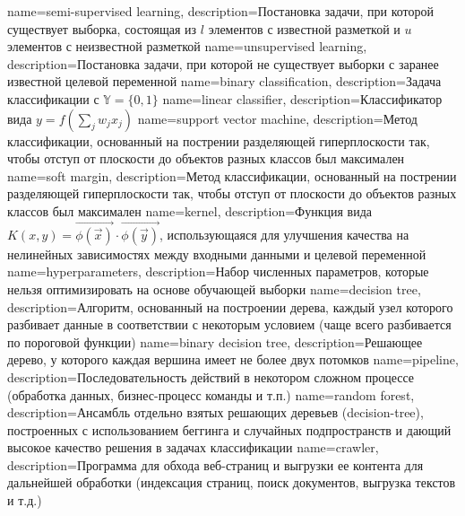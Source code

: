{
    name=semi-supervised learning,
    description={Постановка задачи, при которой существует выборка, состоящая из $l$ элементов с известной разметкой и $u$ элементов с неизвестной разметкой}
}
{
    name=unsupervised learning,
    description={Постановка задачи, при которой не существует выборки с заранее известной целевой переменной}
}
{
    name=binary classification,
    description={Задача классификации с $\mathbb{Y} = \{0, 1\}$}
}
{
    name=linear classifier,
    description={Классификатор вида $y = f\left( \sum\limits_{j}^{} w_j x_j \right)$}
}
{
    name=support vector machine,
    description={Метод классификации, основанный на пострении разделяющей гиперплоскости так, чтобы отступ от плоскости до объектов разных классов был максимален}
}
{
    name=soft margin,
    description={Метод классификации, основанный на пострении разделяющей гиперплоскости так, чтобы отступ от плоскости до объектов разных классов был максимален}
}
{
    name=kernel,
    description={Функция вида $K(x, y) = \vec{\phi(\vec{x})} \cdot \vec{\phi(\vec{y})}$, использующаяся для улучшения качества на нелинейных зависимостях между входными данными и целевой переменной}
}
{
    name=hyperparameters,
    description={Набор численных параметров, которые нельзя оптимизировать на основе обучающей выборки}
}
{
    name=decision tree,
    description={Алгоритм, основанный на построении дерева, каждый узел которого разбивает данные в соответствии с некоторым условием (чаще всего разбивается по пороговой функции)}
}
{
    name=binary decision tree,
    description={Решающее дерево, у которого каждая вершина имеет не более двух потомков}
}
{
    name=pipeline,
    description={Последовательность действий в некотором сложном процессе (обработка данных, бизнес-процесс команды и т.п.)}
}
{
    name=random forest,
    description={Ансамбль отдельно взятых решающих деревьев (\gls{decision-tree}), построенных с использованием беггинга и случайных подпространств и дающий высокое качество решения в задачах классификации}
}
{
    name=crawler,
    description={Программа для обхода веб-страниц и выгрузки ее контента для дальнейшей обработки (индексация страниц, поиск документов, выгрузка текстов и т.д.)}
}
